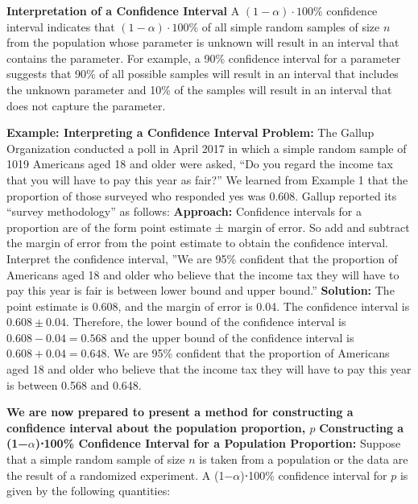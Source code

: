 \documentclass{report}
\begin{document}
    \bigbreak \noindent 
    \textbf{Interpretation of a Confidence Interval}
    \bigbreak \noindent 
    A $(1-\alpha)\cdot 100\%$ confidence interval indicates that $(1-\alpha)\cdot 100\%$ of all simple random samples of size $n$ from the population whose parameter is unknown will result in an interval that contains the parameter.
    \bigbreak \noindent 
    For example, a 90\% confidence interval for a parameter suggests that 90\% of all possible samples will result in an interval that includes the unknown parameter and 10\% of the samples will result in an interval that does not capture the parameter.
    \begin{mdframed}
      \textbf{Example: Interpreting a Confidence Interval}
      \bigbreak \noindent 
      \textbf{Problem:}
      The Gallup Organization conducted a poll in April 2017 in which a simple random sample of 1019 Americans aged 18 and older were asked, “Do you regard the income tax that you will have to pay this year as fair?” We learned from Example 1 that the proportion of those surveyed who responded yes was 0.608. Gallup reported its “survey methodology” as follows:
      \bigbreak \noindent 
      \textbf{Approach:}
      Confidence intervals for a proportion are of the form point estimate ± margin of error. So add and subtract the margin of error from the point estimate to obtain the confidence interval. Interpret the confidence interval, ”We are 95\% confident that the proportion of Americans aged 18 and older who believe that the income tax they will have to pay this year is fair is between lower bound and upper bound.”
      \bigbreak \noindent 
      \textbf{Solution:}
      \bigbreak \noindent 
      The point estimate is 0.608, and the margin of error is 0.04. The confidence interval is $0.608 \pm 0.04$. Therefore, the lower bound of the confidence interval is $0.608 - 0.04 = 0.568$ and the upper bound of the confidence interval is $0.608 + 0.04 = 0.648$. We are 95\% confident that the proportion of Americans aged 18 and older who believe that the income tax they will have to pay this year is between 0.568 and 0.648.
      \bigbreak \noindent 
    \end{mdframed}
    \bigbreak \noindent 
      \textbf{We are now prepared to present a method for constructing a confidence interval about the population proportion, $p $}
      \bigbreak \noindent 
      \textbf{Constructing a (1−$\alpha $)⋅100\% Confidence Interval for a Population Proportion:}
      \bigbreak \noindent 
      Suppose that a simple random sample of size $n $ is taken from a population or the data are the result of a randomized experiment. A (1−$\alpha $)⋅100\% confidence interval for $p $ is given by the following quantities:
\end{document}
